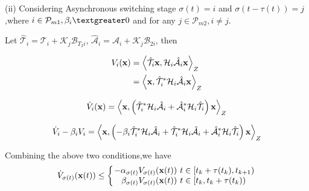\documentclass[twocolumn]{autart}    %
\begin{document}
\begin{pf}

(ii) Considering Asynchronous switching stage $\sigma(t) = i$ and $\sigma(t-\tau(t)) = j$,where $i \in \mathcal{P}_{m1},\beta_{i} \textgreater 0$ and for any $j\in\mathcal{P}_{m2},i \ne j$. 

Let $\hat{\mathcal{T}}_{i} = \mathcal{T}_{i}+\mathcal{K}_{j}\mathcal{B}_{T_{2}i}$, $\hat{\mathcal{A}}_{i} = \mathcal{A}_{i}+\mathcal{K}_{j}\mathcal{B}_{2i}$, then

\begin{equation}
    \begin{aligned}
        \setlength{\arraycolsep}{0.9pt}
        V_{i}(\bold{x}) & = \left \langle \hat{\mathcal{T}}_{i}\bold{x},\mathcal{H}_{i}\hat{\mathcal{A}}_{i}\bold{x} \right \rangle_{Z}\\
& = \left \langle \bold{x},\hat{\mathcal{T}}_{i}^{*}\mathcal{H}_{i}\hat{\mathcal{A}}_{i}\bold{x} \right \rangle_{Z}
\end{aligned}
\end{equation}

\begin{equation}
    \begin{aligned}
        \setlength{\arraycolsep}{0.9pt}
        \dot{V}_{i}(\bold{x})  = \left \langle \bold{x},\left(\hat{\mathcal{T}}_{i}^{*}\mathcal{H}_{i}\hat{\mathcal{A}}_{i}+\hat{\mathcal{A}}_{i}^{*}\mathcal{H}_{i}\hat{\mathcal{T}}_{i}\right)\bold{x} \right \rangle_{Z}
\end{aligned}
\end{equation}

\begin{equation}
    \begin{aligned}
        \setlength{\arraycolsep}{0.9pt}
        \dot{V}_{i}-\beta_{i} V_{i}  = \left \langle \bold{x},\left(-\beta_{i}\hat{\mathcal{T}}_{i}^{*}\mathcal{H}_{i}\hat{\mathcal{A}}_{i}+\hat{\mathcal{T}}_{i}^{*}\mathcal{H}_{i}\hat{\mathcal{A}}_{i}+\hat{\mathcal{A}}_{i}^{*}\mathcal{H}_{i}\hat{\mathcal{T}}_{i}\right)\bold{x} \right \rangle_{Z}
\end{aligned}
\end{equation}



    Combining the above two conditions,we have
    \begin{equation}
        \begin{aligned}
            \setlength{\arraycolsep}{0.9pt}
            \dot{V}_{\sigma(t)}(\bold{x}(t)) \leq \left\{
                \begin{array}{rcl}
                -\alpha_{\sigma(t)}V_{\sigma(t)}(\bold{x}(t))       &      & {t \in [t_{k}+\tau(t_{k}),t_{k+1})}\\
                \beta_{\sigma(t)}V_{\sigma(t)}(\bold{x}(t))     &      & {t \in [t_{k},t_{k}+\tau(t_{k}))}
                \end{array}
            \right.
        \end{aligned}
    \end{equation}


\end{pf}
\end{document}
